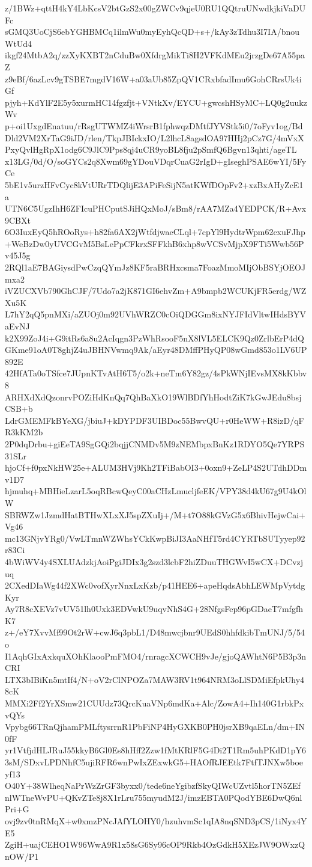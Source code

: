 z/1BWz+qttH4kY4LbKcsV2btGzS2x00gZWCv9qjeU0RU1QQtruUNwdkjkiVaDUFc
sGMQ3UoCjS6ebYGHBMCq1ilmWu0myEyhQcQD+s+/kAy3zTdhu3I7IA/bnouWtUd4
ikgf24MtbA2q/zzXyKXBT2nCduBw0XfdrgMikTi8H2VFKdMEu2jrzgDe67A55paZ
z9eBf/6azLcv9gTSBE7mgdV16W+a03aUb85ZpQV1CRxbfadImu6GohCRrsUk4iGf
pjyh+KdYlF2E5y5xurmHC14fgzfjt+VNtkXv/EYCU+gwcshHSyMC+LQ0g2uukzWv
p+oi1UxgdEnatuu/rRsgUTWMZ4iWrsrB1fphwqzDMtfJYVStk5i0/7oFyv1og/Bd
Dld2VM2XrTaG9iJD/rlen/TkpJBIckxIO/L2lhcL8agsdOA97HHj2pCz7G/4mVxX
PxyQvlHgRpX1odg6C9JlC9Pps8qj4uCR9yoBL8fju2pSmfQ6Bgvn13qhti/ageTL
x13LG/0d/O/soGYCs2q8Xwm69gYDouVDqrCuaG2rIgD+gIseghPSAE6wYI/5FyCe
5bE1v5urzHFvCyc8kVtURrTDQlijE3APiFeSijN5atKWfDOpFv2+xzBxAHyZcE1a
UTN6C5UgzIhH6ZFIcuPHCputSJiHQxMoJ/sBm8/rAA7MZa4YEDPCK/R+Avx9CBXt
6O3IuxEyQ5hROoRys+h82fa6AX2jWtfdjwaeCLql+7cpYl9HydtrWpm62cxuFJhp
+WeBzDw0yUVCGvM5BsLePpCFkrxSFFkhB6xhp8wVCSvMjpX9FTi5Wwb56Pv45J5g
2RQl1aE7BAGiysdPwCzqQYmJz8KF5raBRHxcsma7FoazMmoMIjObBSYjOEOJmxa2
iVZUCXVb790GhCJF/7Udo7a2jK871GI6ehvZm+A9bmpb2WCUKjFR5erdg/WZXu5K
L7hY2qQ5pnMXi/aZUOj0m92UVhWRZC0cOiQDGGm8ixNYJFIdVltwIHdsBYVaEvNJ
k2X99ZoJ4i+G9itRs6a8u2AcIqgn3PzWhRsooF5nX8lVL5ELCK9Qz0ZrlbErP4dQ
GKme91oA0T8ghjZ4uJBHNVwmq9Ak/aEyr48DMffPHyQP08wGmd853o1LV6UP892E
42HfATa0oTSfce7JUpnKTvAtH6T5/o2k+neTm6Y82gz/4sPkWNjIEvsMX8kKbbv8
ARHXdXdQzonrvPOZiHdKnQq7QhBaXkO19WlBDfYhHodtZiK7kGwJEdu8bsjCSB+b
LdrGMEMFkBYeXG/jbiuJ+kDYPDF3UIBDoc55BwvQU+r0HeWW+R8izD/qFR3kKM2b
2P0dqDrbu+giEeTA9SgGQi2bqjjCNMDv5M9zNEMbpxBnKz1RDYO5Qe7YRPS31SLr
hjoCf+f0pxNkHW25e+ALUM3HVj9Kh2TFiBabOI3+0oxn9+ZeLP4S2UTdhDDmv1D7
hjmuhq+MBHieLzarL5oqRBcwQeyC00aCHzLmucljfeEK/VPY38d4kU67g9U4kOlW
SBRWZw1JzmdHatBTHwXLxXJ5spZXuIj+/M+t7O88kGVzG5x6BhivHejwCai+Vg46
mc13GNjvYRg0/VwLTmnWZWhsYCkKwpBiJI3AaNHfT5rd4CYRTbSUTyyep92r83Ci
4bWiWV4y4SXLUAdzkjAoiPgiJDIx3g2szd3lcbF2hiZDuuTHGWvI5wCX+DCvzjuq
2CXedDIaWg44f2XWc0vofXyrNnxLxKzb/p41HEE6+apeHqdsAbhLEWMpVytdgKyr
Ay7R8cXEVz7vUV51lh0Uxk3EDVwkU9uqvNhS4G+28NfgsFep96pGDaeT7mfgfhK7
z+/eY7XvvMf99Ot2rW+cwJ6q3pbL1/D48mwcjbnr9UEdS0hhfdkibTmUNJ/5/54o
I1AqhGIxAxkquXOhKlaooPmFMO4/rnragcXCWCH9vJe/gjoQAWhtN6P5B3p3nCRI
LTX3bIBiKn5mtIf4/N+oV2rClNPOZa7MAW3RV1t964NRM3oLlSDMiEfpkUhy48cK
MMXi2Ff2YrXSmw21CUUdz73QrcKuaVNp6mdKa+Alc/ZowA4+Ih140G1rbkPxvQYs
Vpybg66TRnQjhamPMLftysrrnR1PbFiNP4HyGXKB0PH0jsrXB9qaELn/dm+IN0fF
yr1VtfjdHLJRuJ55kkyB6Gl0Es8hHff2Zzw1fMtKRlF5G4Di2T1Rm5uhPKdD1pY6
3sM/SDxvLPDNhfC5ujiRFR6wnPwIxZExwkG5+HAOfRJEEtk7FtfTJNXw5boeyf13
O40Y+38WlheqNaPrWzZrGF3byxx0/tede6neYgibzfSkyQIWcUZvtl5horTN5ZEf
nlWTneWvPU+QKvZTe8j8X1rLru755myudM2J/imzEBTA0PQodYBE6DwQ6nlPri+G
ovj9zv0tnRMqX+w0xmzPNcJAfYLOHY0/hzuhvmSc1qIA8nqSND3pCS/1iNyx4YE5
ZgiH+uajCEHO1W96WwA9R1x58sG6Sy96cOP9Rkb4OzGdkH5XEzJW9OWxzQnOW/P1
